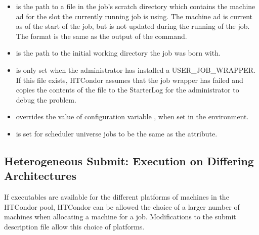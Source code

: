 \begin{itemize}
\item {}
is the path to a file in the job's scratch directory which contains
the machine ad for the slot the currently running job is using.  
The machine ad is current as of the start of the job, but is not updated during the running
of the job.  The format is the same as the output of the
   command.

\item {}
is the path to the initial working directory the job was born with.

\item {}
is only set when the administrator has installed a USER\_JOB\_WRAPPER.
If this file exists, HTCondor assumes that the job wrapper has failed
and copies the contents of the file to the StarterLog for the administrator
to debug the problem.

\item {}
overrides the value of configuration variable ,
when set in the environment.

\item {}
is set for scheduler universe jobs to be the same as the 
attribute.

\end{itemize}



\subsection{Heterogeneous Submit: Execution on Differing Architectures} 

If executables are available for the different platforms of machines
in the HTCondor pool,
HTCondor can be allowed the choice of a larger number of machines
when allocating a machine for a job.
Modifications to the submit description file allow this choice
of platforms.

